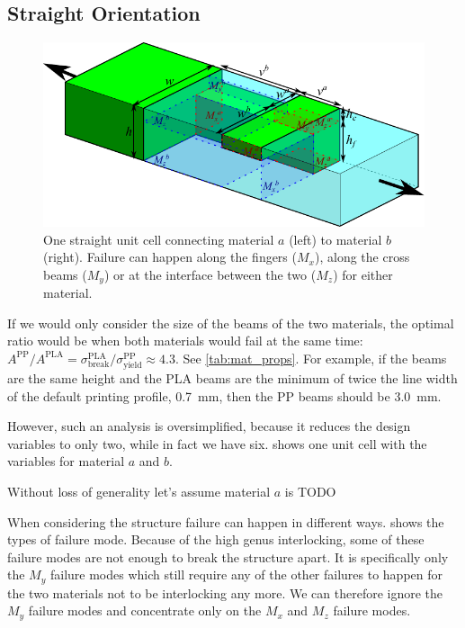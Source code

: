 \subsection{Straight Orientation}

\begin{figure}
	\centering
	\includegraphics[width=\columnwidth]{../sources/method/straight_model_v2.pdf}
	\caption{
		One straight unit cell connecting material $a$ (left) to material $b$ (right).
		Failure can happen along the fingers ($M_x$), along the cross beams ($M_y$) or at the interface between the two ($M_z$) for either material.}
	\label{fig:failure_modes}
\end{figure}





If we would only consider the size of the beams of the two materials,
the optimal ratio would be when both materials would fail at the same time:
$
A^\text{PP} / A^\text{PLA} = \sigma^\text{PLA}_\text{break} / \sigma^\text{PP}_\text{yield}  \approx 4.3
$.
See \cref{tab:mat_props}.
For example, if the beams are the same height and the PLA beams are the minimum of twice the line width of the default printing profile, \SI{0.7}{\milli\meter}, 
then the PP beams should be \SI{3.0}{\milli\meter}.

However, such an analysis is oversimplified, because it reduces the design variables to only two,
while in fact we have six.
 shows one unit cell with the variables for material $a$ and $b$.


Without loss of generality let's assume material $a$ is TODO

When considering the structure failure can happen in different ways.
 shows the types of failure mode.
Because of the high genus interlocking, some of these failure modes are not enough to break the structure apart.
It is specifically only the $M_y$ failure modes which still require any of the other failures to happen for the two materials not to be interlocking any more.
We can therefore ignore the $M_y$ failure modes and concentrate only on the $M_x$ and $M_z$ failure modes.

